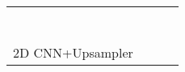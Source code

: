 \documentclass{article}
\begin{document}
\begin{table}[!tb]
\begin{center}
{\begin{tabular}{l|l|c|c}
                                                        &             &                       &               \\
                                                        &       &                       &               \\
                                                        &   &                       &               \\
                                                        &             &                       &               \\
                                                        &   &                  &               \\
                                                        &             &                       &               \\
                                                        &       &                       &               \\\hline                                                
	\multirow{5}{*}{2D CNN+Upsampler}                   &   &  &       \\
	                                                    &    &                       &               \\
                                                        &     &                       &               \\
                                                        &       &                       &               \\
                                                        &          &                       &   \\
	\bottomrule[1.5pt]
	\end{tabular}
	}  \end{center}
\end{table}
\end{document}
